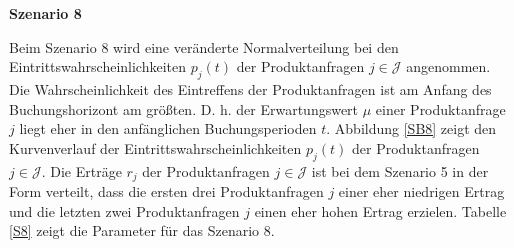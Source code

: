 \textbf{Szenario 8}

Beim Szenario 8 wird eine veränderte Normalverteilung bei den Eintrittswahrscheinlichkeiten $p_j(t)$ der Produktanfragen $j\in\mathcal{J}$ angenommen. Die Wahrscheinlichkeit des Eintreffens der Produktanfragen ist am Anfang des Buchungshorizont am größten. D. h. der Erwartungswert $\mu$ einer Produktanfrage $j$ liegt eher in den anfänglichen Buchungsperioden $t$. Abbildung \ref{SB8} zeigt den Kurvenverlauf der Eintrittswahrscheinlichkeiten $p_j(t)$ der Produktanfragen $j\in\mathcal{J}$. Die Erträge $r_j$ der Produktanfragen $j\in\mathcal{J}$ ist bei dem Szenario 5 in der Form verteilt, dass die ersten drei Produktanfragen $j$ einer eher niedrigen Ertrag und die letzten zwei Produktanfragen $j$ einen eher hohen Ertrag erzielen. Tabelle \ref{S8} zeigt die Parameter für das Szenario 8.


